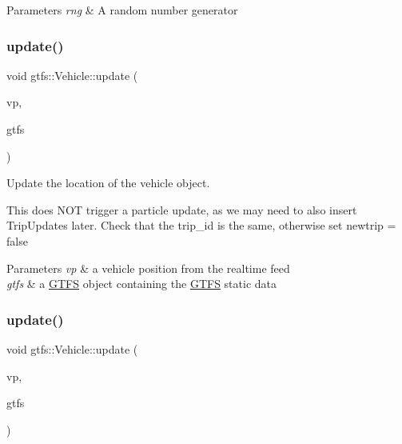 \begin{DoxyParams}{Parameters}
{\em rng} & A random number generator \\
\hline
\end{DoxyParams}
\mbox{\label{classgtfs_1_1Vehicle_add9266d843398c88d3fcc22239f586a9}} 
\subsubsection{\texorpdfstring{update()}{update()}\hspace{0.1cm}{\footnotesize\ttfamily [2/3]}}
{\footnotesize\ttfamily void gtfs\+::\+Vehicle\+::update (\begin{DoxyParamCaption}\item[{const transit\+\_\+realtime\+::\+Vehicle\+Position \&}]{vp,  }\item[{\hyperlink{classgtfs_1_1GTFS}{G\+T\+FS} \&}]{gtfs }\end{DoxyParamCaption})}

Update the location of the vehicle object.

This does N\+OT trigger a particle update, as we may need to also insert Trip\+Updates later. Check that the trip\+\_\+id is the same, otherwise set {\ttfamily newtrip = false}


\begin{DoxyParams}{Parameters}
{\em vp} & a vehicle position from the realtime feed \\
\hline
{\em gtfs} & a \hyperlink{classgtfs_1_1GTFS}{G\+T\+FS} object containing the \hyperlink{classgtfs_1_1GTFS}{G\+T\+FS} static data \\
\hline
\end{DoxyParams}
\mbox{\label{classgtfs_1_1Vehicle_ae9944f06fb0bde02f2d7c21f2dc33787}} 
\subsubsection{\texorpdfstring{update()}{update()}\hspace{0.1cm}{\footnotesize\ttfamily [3/3]}}
{\footnotesize\ttfamily void gtfs\+::\+Vehicle\+::update (\begin{DoxyParamCaption}\item[{const transit\+\_\+realtime\+::\+Trip\+Update \&}]{vp,  }\item[{\hyperlink{classgtfs_1_1GTFS}{G\+T\+FS} \&}]{gtfs }\end{DoxyParamCaption})}

